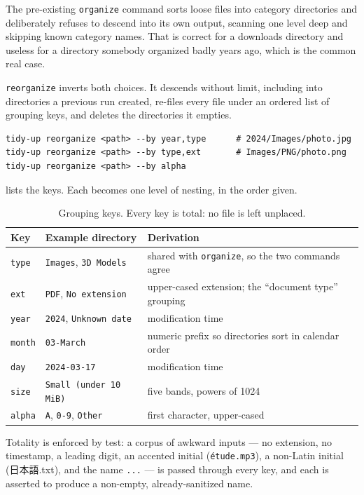 \documentclass[11pt,a4paper]{article}
\newcommand{\unisample}[2]{\texttt{#2}\,\textsuperscript{\tiny(non-Latin)}}
\newcommand{\unisample}[2]{\texttt{#2}\,\textsuperscript{\tiny(non-Latin)}}
\renewcommand{\unisample}[2]{{\cjkfont #1}}%
\newcommand{\code}[1]{\texttt{\small #1}}
\begin{document}
The pre-existing \code{organize} command sorts loose files into category directories
and deliberately refuses to descend into its own output, scanning one level deep and
skipping known category names. That is correct for a downloads directory and useless
for a directory somebody organized badly years ago, which is the common real case.

\code{reorganize} inverts both choices. It descends without limit, including into
directories a previous run created, re-files every file under an ordered list of
grouping keys, and deletes the directories it empties.

\begin{lstlisting}[style=shell]
tidy-up reorganize <path> --by year,type      # 2024/Images/photo.jpg
tidy-up reorganize <path> --by type,ext       # Images/PNG/photo.png
tidy-up reorganize <path> --by alpha
\end{lstlisting}

 lists the keys. Each becomes one level of nesting, in the order given.

\begin{table}[t]
\centering
\small
\caption{Grouping keys. Every key is total: no file is left unplaced.}
\label{tab:keys}
\begin{tabularx}{\textwidth}{@{}l l X@{}}
\toprule
\textbf{Key} & \textbf{Example directory} & \textbf{Derivation} \\
\midrule
\code{type}  & \code{Images}, \code{3D Models} & shared with \code{organize}, so the
  two commands agree \\
\code{ext}   & \code{PDF}, \code{No extension} & upper-cased extension; the
  \enquote{document type} grouping \\
\code{year}  & \code{2024}, \code{Unknown date} & modification time \\
\code{month} & \code{03-March} & numeric prefix so directories sort in calendar order \\
\code{day}   & \code{2024-03-17} & modification time \\
\code{size}  & \code{Small (under 10 MiB)} & five bands, powers of 1024 \\
\code{alpha} & \code{A}, \code{0-9}, \code{Other} & first character, upper-cased \\
\bottomrule
\end{tabularx}
\end{table}

Totality is enforced by test: a corpus of awkward inputs --- no extension, no
timestamp, a leading digit, an accented initial (\code{étude.mp3}), a non-Latin
initial (\unisample{日本語.txt}{nihongo.txt}), and the name \code{...} --- is passed
through every key, and each is asserted to produce a non-empty, already-sanitized
name.
\end{document}
